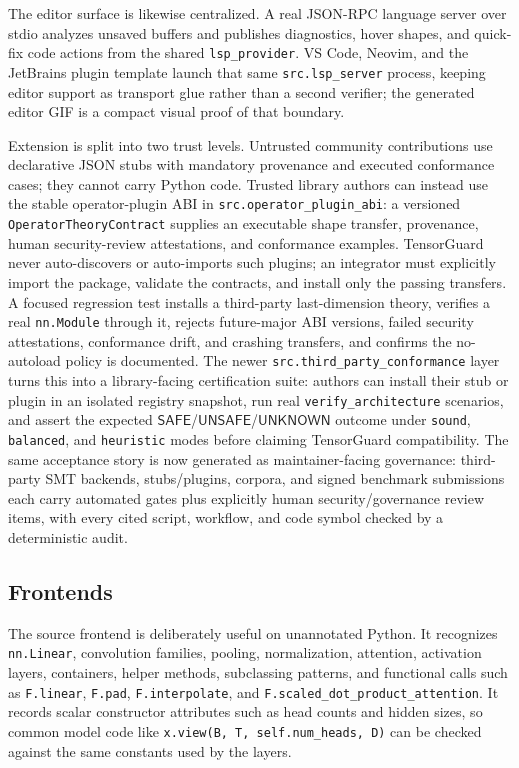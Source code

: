 \documentclass[11pt]{article}
\newcommand{\unknown}{\ensuremath{\mathsf{UNKNOWN}}}
\newcommand{\safe}{\ensuremath{\mathsf{SAFE}}}
\newcommand{\unsafe}{\ensuremath{\mathsf{UNSAFE}}}
\begin{document}
The editor surface is likewise centralized.  A real JSON-RPC language server
over stdio analyzes unsaved buffers and publishes diagnostics, hover shapes, and
quick-fix code actions from the shared \texttt{lsp\_provider}.  VS Code,
Neovim, and the JetBrains plugin template launch that same
\texttt{src.lsp\_server} process, keeping editor support as transport glue
rather than a second verifier; the generated editor GIF is a compact visual
proof of that boundary.

Extension is split into two trust levels.  Untrusted community contributions use
declarative JSON stubs with mandatory provenance and executed conformance cases;
they cannot carry Python code.  Trusted library authors can instead use the
stable operator-plugin ABI in \texttt{src.operator\_plugin\_abi}: a versioned
\texttt{OperatorTheoryContract} supplies an executable shape transfer, provenance,
human security-review attestations, and conformance examples.  TensorGuard never
auto-discovers or auto-imports such plugins; an integrator must explicitly import
the package, validate the contracts, and install only the passing transfers.  A
focused regression test installs a third-party last-dimension theory, verifies a
real \texttt{nn.Module} through it, rejects future-major ABI versions, failed
security attestations, conformance drift, and crashing transfers, and confirms the
no-autoload policy is documented.  The newer
\texttt{src.third\_party\_conformance} layer turns this into a library-facing
certification suite: authors can install their stub or plugin in an isolated
registry snapshot, run real \texttt{verify\_architecture} scenarios, and assert
the expected \safe{}/\unsafe{}/\unknown{} outcome under \texttt{sound},
\texttt{balanced}, and \texttt{heuristic} modes before claiming TensorGuard
compatibility.  The same acceptance story is now generated as maintainer-facing
governance: third-party SMT backends, stubs/plugins, corpora, and signed
benchmark submissions each carry automated gates plus explicitly human
security/governance review items, with every cited script, workflow, and code
symbol checked by a deterministic audit.

\subsection{Frontends}

The source frontend is deliberately useful on unannotated Python.  It recognizes
\texttt{nn.Linear}, convolution families, pooling, normalization, attention,
activation layers, containers, helper methods, subclassing patterns, and
functional calls such as \texttt{F.linear}, \texttt{F.pad},
\texttt{F.interpolate}, and \texttt{F.scaled\_dot\_product\_attention}.  It records scalar constructor
attributes such as head counts and hidden sizes, so common model code like
\texttt{x.view(B, T, self.num\_heads, D)} can be checked against the same
constants used by the layers.
\end{document}
